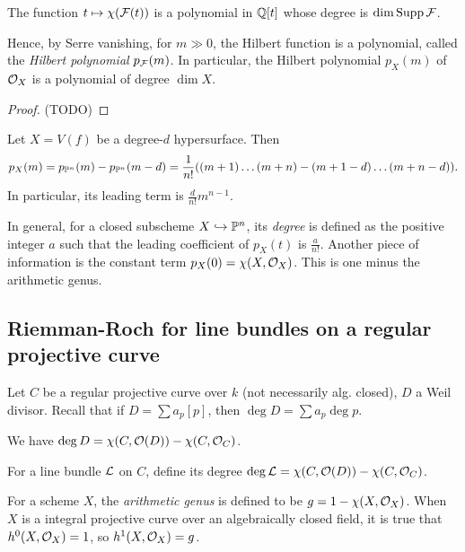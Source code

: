 \documentclass[11pt]{amsart}
\begin{document}
\begin{thm}
    The function $t\mapsto \chi(\mathcal{F}(t))$ is a polynomial in $\mathbb{Q}[t]$ whose degree is $\dim \operatorname{Supp} \mathcal{F}$.
\end{thm}

Hence, by Serre vanishing, for $m\gg 0$, the Hilbert function is a polynomial, called the \emph{Hilbert polynomial} $p_{\mathcal{F}}(m)$. In particular, the Hilbert polynomial $p_X(m)$ of $\mathcal{O}_X$ is a polynomial of degree $\dim X$.


\begin{proof}
    (TODO)
\end{proof}

\begin{exm}
    Let $X = V(f)$ be a degree-$d$ hypersurface. Then 
    \[p_X(m) = p_{\mathbb{P}^n}(m) - p_{\mathbb{P}^n}(m-d) = \frac{1}{n!}((m+1)\dots(m+n) - (m+1-d)\dots(m+n-d)).\]
    In particular, its leading term is $\frac{d}{n!}m^{n-1}$.
\end{exm}

\begin{Rem}
In general, for a closed subscheme $X\hookrightarrow \mathbb{P}^n$, its \emph{degree} is defined as the positive integer $a$ such that the leading coefficient of $p_X(t)$ is $\frac{a}{n!}$. Another piece of information is the constant term $p_X(0) = \chi(X, \mathcal{O}_X)$. This is one minus the arithmetic genus.
\end{Rem}




\subsection{Riemman-Roch for line bundles on a regular projective curve}

Let $C$ be a regular projective curve over $k$ (not necessarily alg. closed), $D$ a Weil divisor. Recall that if $D = \sum a_p [p]$, then $\deg D = \sum a_p \deg p$.

\begin{thm}
    We have $\deg D = \chi(C, \mathcal{O}(D)) - \chi(C, \mathcal{O}_C)$.
\end{thm}

\begin{defn}
    For a line bundle $\mathcal{L}$ on $C$, define its degree $\deg \mathcal{L} = \chi(C, \mathcal{O}(D)) - \chi(C, \mathcal{O}_C)$. 
\end{defn}


\begin{defn}
    For a scheme $X$, the \emph{arithmetic genus} is defined to be $g = 1 - \chi(X,\mathcal{O}_X)$. When $X$ is a integral projective curve over an algebraically closed field, it is true that $h^0(X,\mathcal{O}_X) = 1$, so $h^1(X,\mathcal{O}_X) = g$. 
\end{defn}
\end{document}
